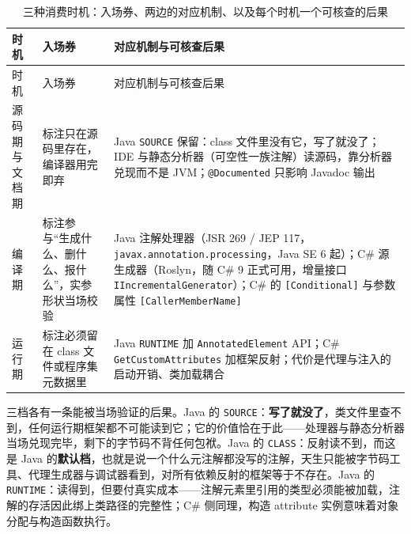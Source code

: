 \documentclass[12pt,a4paper,fontset=fandol]{ctexbook}
\begin{document}
{\footnotesize
\begin{longtable}{@{}>{\raggedright\arraybackslash}p{}>{\raggedright\arraybackslash}p{}>{\raggedright\arraybackslash}p{}@{}}
\caption{三种消费时机：入场券、两边的对应机制、以及每个时机一个可核查的后果}\label{tab:ch3-retention-matrix}\\
\toprule
时机 & 入场券 & 对应机制与可核查后果 \\
\midrule
\endfirsthead
\toprule
时机 & 入场券 & 对应机制与可核查后果 \\
\midrule
\endhead
\bottomrule
\endfoot
源码期与文档期 & 标注只在源码里存在，编译器用完即弃 & Java \texttt{SOURCE} 保留：class 文件里没有它，写了就没了；IDE 与静态分析器（可空性一族注解）读源码，靠分析器兑现而不是 JVM；\texttt{@Documented} 只影响 Javadoc 输出 \\
编译期 & 标注参与“生成什么、删什么、报什么”，实参形状当场校验 & Java 注解处理器（JSR 269 / JEP 117，\texttt{javax.annotation.processing}，Java SE 6 起）；C\# 源生成器（Roslyn，随 C\# 9 正式可用，增量接口 \texttt{IIncrementalGenerator}）；C\# 的 \texttt{[Conditional]} 与参数属性 \texttt{[CallerMemberName]} \\
运行期 & 标注必须留在 class 文件或程序集元数据里 & Java \texttt{RUNTIME} 加 \texttt{AnnotatedElement} API；C\# \texttt{GetCustomAttributes} 加框架反射；代价是代理与注入的启动开销、类加载耦合 \\
\end{longtable}}

三档各有一条能被当场验证的后果。Java 的 \texttt{SOURCE}：\textbf{写了就没了}，类文件里查不到，任何运行期框架都不可能读到它；它的价值恰在于此——处理器与静态分析器当场兑现完毕，剩下的字节码不背任何包袱。Java 的 \texttt{CLASS}：反射读不到，而这是 Java 的\textbf{默认档}，也就是说一个什么元注解都没写的注解，天生只能被字节码工具、代理生成器与调试器看到，对所有依赖反射的框架等于不存在。Java 的 \texttt{RUNTIME}：读得到，但要付真实成本——注解元素里引用的类型必须能被加载，注解的存活因此绑上类路径的完整性；C\# 侧同理，构造 attribute 实例意味着对象分配与构造函数执行。
\end{document}
